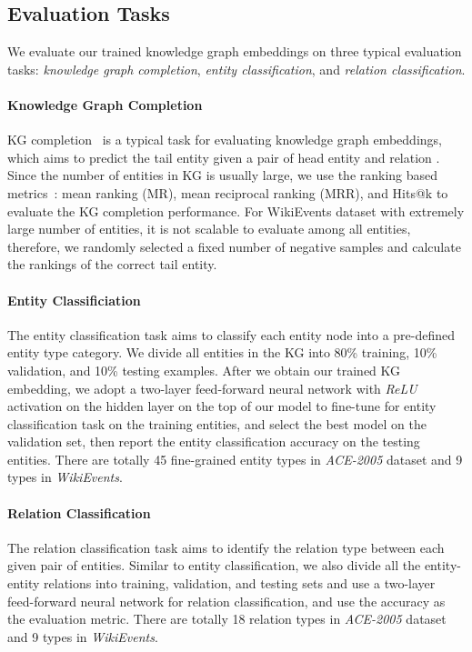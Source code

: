 \subsection{Evaluation Tasks}
We evaluate our trained knowledge graph embeddings on three typical evaluation tasks: \emph{knowledge graph completion}, \emph{entity classification}, and \emph{relation classification}.
\paragraph{Knowledge Graph Completion}
KG completion~\cite{transe} is a typical task for evaluating knowledge graph embeddings, which aims to predict the tail entity  given a pair of head entity  and relation . 
Since the number of entities in KG is usually large, we use the ranking based metrics~\cite{transe}: mean ranking (MR), mean reciprocal ranking (MRR), and Hits@k to evaluate the KG completion performance.
For WikiEvents dataset with extremely large number of entities, it is not scalable to evaluate among all entities, therefore, we randomly selected a fixed number of negative samples and calculate the rankings of the correct tail entity.
\paragraph{Entity Classificiation}
The entity classification task aims to classify each entity node into a pre-defined entity type category.
We divide all entities in the KG into 80\% training, 10\% validation, and 10\% testing examples.
After we obtain our trained KG embedding, we adopt a two-layer feed-forward neural network with \emph{ReLU} activation on the hidden layer on the top of our model to fine-tune for entity classification task on the training entities, and select the best model on the validation set, then report the entity classification accuracy on the testing entities. 
There are totally 45 fine-grained entity types in \emph{ACE-2005} dataset and 9 types in \emph{WikiEvents}.
\paragraph{Relation Classification}
The relation classification task aims to identify the relation type between each given pair of entities.
Similar to entity classification, we also divide all the entity-entity relations into training, validation, and testing sets and use a two-layer feed-forward neural network for relation classification, and use the accuracy as the evaluation metric.
There are totally 18 relation types in \emph{ACE-2005} dataset and 9 types in \emph{WikiEvents}.


